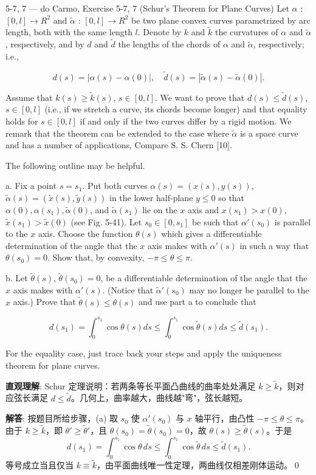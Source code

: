 \begin{exercise}{5-7, 7 — do Carmo, Exercise 5-7, 7 (Schur's Theorem for Plane Curves)}
Let $\alpha$ : $[0, l] \to R^2$ and $\tilde{\alpha}$ : $[0, l] \to R^2$ be two plane convex curves parametrized by arc length, both with the same length $l$. Denote by $k$ and $\tilde{k}$ the curvatures of $\alpha$ and $\tilde{\alpha}$, respectively, and by $d$ and $\tilde{d}$ the lengths of the chords of $\alpha$ and $\tilde{\alpha}$, respectively; i.e.,

$$
d (s) = | \alpha (s) - \alpha (0) |, \quad \tilde {d} (s) = | \tilde {\alpha} (s) - \tilde {\alpha} (0) |.
$$

Assume that $k(s) \geq \tilde{k}(s)$, $s \in [0, l]$. We want to prove that $d(s) \leq \tilde{d}(s)$, $s \in [0, l]$ (i.e., if we stretch a curve, its chords become longer) and that equality holds for $s \in [0, l]$ if and only if the two curves differ by a rigid motion. We remark that the theorem can be extended to the case where $\tilde{\alpha}$ is a space curve and has a number of applications, Compare S. S. Chern [10].

The following outline may be helpful.

a. Fix a point $s = s_1$. Put both curves $\alpha(s) = (x(s), y(s))$, $\tilde{\alpha}(s) = (\tilde{x}(s), \tilde{y}(s))$ in the lower half-plane $y \leq 0$ so that $\alpha(0), \alpha(s_1), \tilde{\alpha}(0)$, and $\tilde{\alpha}(s_1)$ lie on the $x$ axis and $x(s_1) > x(0)$, $\tilde{x}(s_1) > \tilde{x}(0)$ (see Fig. 5-41). Let $s_0 \in [0, s_1]$ be such that $\alpha'(s_0)$ is parallel to the $x$ axis. Choose the function $\theta(s)$ which gives a differentiable determination of the angle that the $x$ axis makes with $\alpha'(s)$ in such a way that $\theta(s_0) = 0$. Show that, by convexity, $-\pi \leq \theta \leq \pi$.

b. Let $\tilde{\theta}(s)$, $\tilde{\theta}(s_0) = 0$, be a differentiable determination of the angle that the $x$ axis makes with $\alpha'(s)$. (Notice that $\tilde{\alpha}'(s_0)$ may no longer be parallel to the $x$ axis.) Prove that $\tilde{\theta}(s) \leq \theta(s)$ and use part a to conclude that

$$
d \left(s _ {1}\right) = \int_ {0} ^ {s _ {1}} \cos \theta (s) d s \leq \int_ {0} ^ {s _ {1}} \cos \tilde {\theta} (s) d s \leq \tilde {d} \left(s _ {1}\right).
$$

For the equality case, just trace back your steps and apply the uniqueness theorem for plane curves.
\end{exercise}
\begin{solution}
\textbf{直观理解}: Schur 定理说明：若两条等长平面凸曲线的曲率处处满足 $k\geq\tilde{k}$，则对应弦长满足 $d\leq\tilde{d}$。几何上，曲率越大，曲线越"弯"，弦长越短。

\textbf{解答}: 按题目所给步骤，(a) 取 $s_0$ 使 $\alpha'(s_0)$ 与 $x$ 轴平行，由凸性 $-\pi\leq\theta\leq\pi$。由于 $k\geq\tilde{k}$，即 $\theta'\geq\tilde{\theta}'$，且 $\theta(s_0)=\tilde{\theta}(s_0)=0$，故 $\theta(s)\geq\tilde{\theta}(s)$。于是
\[
d(s_1)=\int_0^{s_1}\cos\theta\,ds\leq\int_0^{s_1}\cos\tilde{\theta}\,ds\leq\tilde{d}(s_1).
\]
等号成立当且仅当 $k\equiv\tilde{k}$，由平面曲线唯一性定理，两曲线仅相差刚体运动。\qed
\end{solution}

